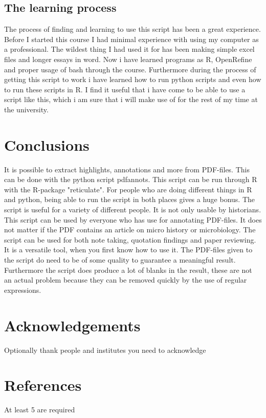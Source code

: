\documentclass{article}
\begin{document}
\subsection{The learning process}
The process of finding and learning to use this script has been a great experience. Before I started this course I had minimal experience with using my computer as a professional. The wildest thing I had used it for has been making simple excel files and longer essays in word. Now i have learned programs as R, OpenRefine and proper usage of bash through the course. Furthermore during the process of getting this script to work i have learned how to run python scripts and even how to run these scripts in R. I find it useful that i have come to be able to use a script like this, which i am sure that i will make use of for the rest of my time at the university.

\section{Conclusions}
It is possible to extract highlights, annotations and more from PDF-files. This can be done with the python script pdfannots. This script can be run through R with the R-package "reticulate". For people who are doing different things in R and python, being able to run the script in both places gives a huge bonus. The script is useful for a variety of different people. It is not only usable by historians. This script can be used by everyone who has use for annotating PDF-files. It does not matter if the PDF contains an article on micro history or microbiology. The script can be used for both note taking, quotation findings and paper reviewing. It is a versatile tool, when you first know how to use it. The PDF-files given to the script do need to be of some quality to guarantee a meaningful result. Furthermore the script does produce a lot of blanks in the result, these are not an actual problem because they can be removed quickly by the use of regular expressions. 

\section{Acknowledgements}
Optionally thank people and institutes you need to acknowledge

\section{References}
At least 5 are required
\end{document}
